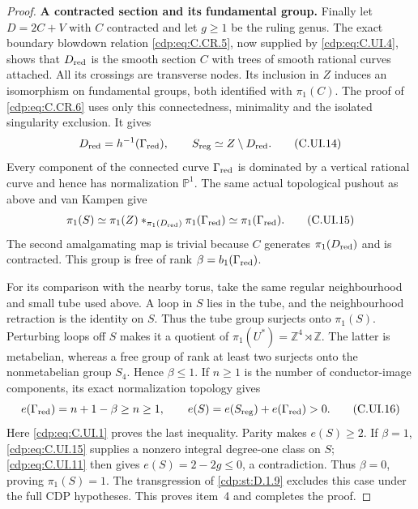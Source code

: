 \begin{proof}
\par\medskip\noindent\textbf{A contracted section and its fundamental group.}\quad
Finally let $D=2C+V$ with $C$ contracted and
let $g\ge1$ be the ruling genus. The exact
boundary blowdown relation \eqref{cdp:eq:C.CR.5}, now
supplied by \eqref{cdp:eq:C.UI.4}, shows that $D_{\rm red}$
is the smooth section $C$ with trees of smooth
rational curves attached. All its crossings
are transverse nodes. Its inclusion in $Z$
induces an isomorphism on fundamental groups,
both identified with $\pi_1(C)$.
The proof of \eqref{cdp:eq:C.CR.6} uses only this
connectedness, minimality and the isolated
singularity exclusion. It gives
\[
 D_{\rm red}=h^{-1}(\Gamma_{\rm red}),\qquad
 S_{\rm reg}\simeq Z\setminus D_{\rm red}.
 \tag{C.UI.14}\label{cdp:eq:C.UI.14}
\]
Every component of the connected curve
$\Gamma_{\rm red}$ is dominated by a vertical
rational curve and hence has normalization
$\mathbb P^1$. The same actual topological
pushout as above and van Kampen give
\[
 \pi_1(S)\simeq
 \pi_1(Z)*_{\pi_1(D_{\rm red})}\pi_1(\Gamma_{\rm red})
 \simeq\pi_1(\Gamma_{\rm red}).
 \tag{C.UI.15}\label{cdp:eq:C.UI.15}
\]
The second amalgamating map is trivial because
$C$ generates $\pi_1(D_{\rm red})$ and is
contracted. This group is free of rank
$\beta=b_1(\Gamma_{\rm red})$.

For its comparison with the nearby torus,
take the same regular neighbourhood and
small tube used above. A loop in $S$ lies
in the tube, and the neighbourhood retraction
is the identity on $S$. Thus the tube group
surjects onto $\pi_1(S)$. Perturbing loops
off $S$ makes it a quotient of
$\pi_1(U^*)=\mathbb Z^4\rtimes\mathbb Z$.
The latter is metabelian, whereas a free
group of rank at least two surjects onto
the nonmetabelian group $S_4$. Hence
$\beta\le1$. If $n\ge1$ is the number
of conductor-image components, its exact
normalization topology gives
\[
 e(\Gamma_{\rm red})=n+1-\beta\ge n\ge1,
 \qquad e(S)=e(S_{\rm reg})+e(\Gamma_{\rm red})>0.
 \tag{C.UI.16}\label{cdp:eq:C.UI.16}
\]
Here \eqref{cdp:eq:C.UI.1} proves the last inequality.
Parity makes $e(S)\ge2$. If $\beta=1$,
\eqref{cdp:eq:C.UI.15} supplies a nonzero integral
degree-one class on $S$; \eqref{cdp:eq:C.UI.11} then
gives $e(S)=2-2g\le0$, a contradiction.
Thus $\beta=0$, proving $\pi_1(S)=1$.
The transgression of \ref{cdp:st:D.1.9} excludes this
case under the full CDP hypotheses. This
proves item~4 and completes the proof.
\end{proof}